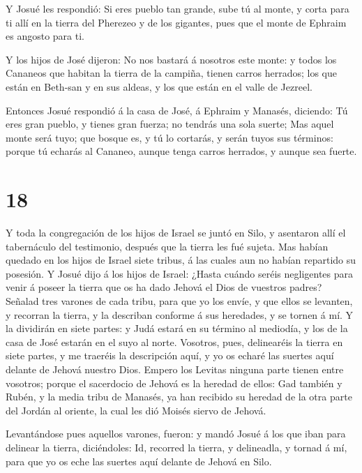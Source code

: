  Y Josué les respondió: Si eres pueblo tan grande, sube tú
al monte, y corta para ti allí en la tierra del Pherezeo y de los
gigantes, pues que el monte de Ephraim es angosto para ti.

 Y los hijos de José dijeron: No nos bastará á nosotros
este monte: y todos los Cananeos que habitan la tierra de la campiña,
tienen carros herrados; los que están en Beth-san y en sus aldeas, y los
que están en el valle de Jezreel.

 Entonces Josué respondió á la casa de José, á Ephraim y
Manasés, diciendo: Tú eres gran pueblo, y tienes gran fuerza; no tendrás
una sola suerte;  Mas aquel monte será tuyo; que bosque es,
y tú lo cortarás, y serán tuyos sus términos: porque tú echarás al
Cananeo, aunque tenga carros herrados, y aunque sea fuerte.

\hypertarget{section-17}{%
\section{18}\label{section-17}}

 Y toda la congregación de los hijos de Israel se juntó en
Silo, y asentaron allí el tabernáculo del testimonio, después que la
tierra les fué sujeta.  Mas habían quedado en los hijos de
Israel siete tribus, á las cuales aun no habían repartido su posesión.
 Y Josué dijo á los hijos de Israel: ¿Hasta cuándo seréis
negligentes para venir á poseer la tierra que os ha dado Jehová el Dios
de vuestros padres?  Señalad tres varones de cada tribu,
para que yo los envíe, y que ellos se levanten, y recorran la tierra, y
la describan conforme á sus heredades, y se tornen á mí.  Y
la dividirán en siete partes: y Judá estará en su término al mediodía, y
los de la casa de José estarán en el suyo al norte. 
Vosotros, pues, delinearéis la tierra en siete partes, y me traeréis la
descripción aquí, y yo os echaré las suertes aquí delante de Jehová
nuestro Dios.  Empero los Levitas ninguna parte tienen entre
vosotros; porque el sacerdocio de Jehová es la heredad de ellos: Gad
también y Rubén, y la media tribu de Manasés, ya han recibido su heredad
de la otra parte del Jordán al oriente, la cual les dió Moisés siervo de
Jehová.

 Levantándose pues aquellos varones, fueron: y mandó Josué á
los que iban para delinear la tierra, diciéndoles: Id, recorred la
tierra, y delineadla, y tornad á mí, para que yo os eche las suertes
aquí delante de Jehová en Silo.

